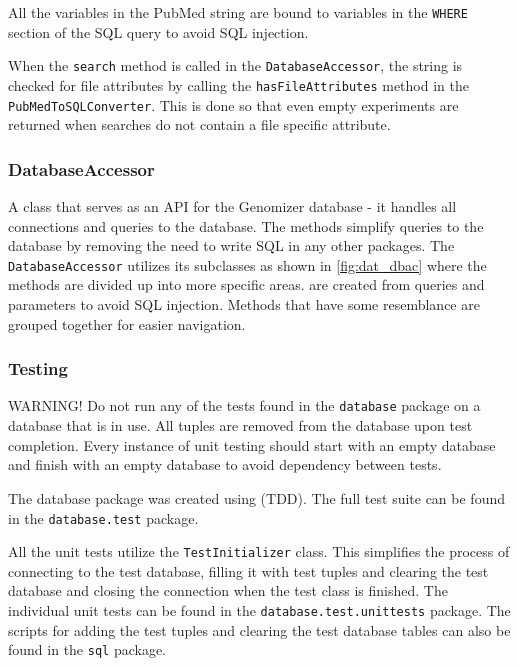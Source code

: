 All the variables in the PubMed string are bound to variables in the \texttt{WHERE} section of the SQL query to avoid SQL injection. 

When the \texttt{search} method is called in the \texttt{DatabaseAccessor}, the  string is checked for file attributes by calling the \texttt{hasFileAttributes} method in the \texttt{PubMedToSQLConverter}. This is done so that even empty experiments are returned when searches do not contain a file specific attribute.

\subsubsection{DatabaseAccessor}
A class that serves as an API for the Genomizer database - it handles all connections and queries to the database. The methods simplify queries to the database by removing the need to write SQL in any other packages. The \texttt{DatabaseAccessor} utilizes its subclasses as shown in \ref{fig:dat_dbac} where the methods are divided up into more specific areas.  are created from queries and parameters to avoid SQL injection. Methods that have some resemblance are grouped together for easier navigation.

\subsubsection{Testing}
WARNING! Do not run any of the tests found in the \texttt{database} package on a database that is in use. All tuples are removed from the database upon test completion. Every instance of unit testing should start with an empty database and finish with an empty database to avoid dependency between tests.

The database package was created using  (TDD). The full test suite can be found in the \texttt{database.test} package.

All the unit tests utilize the \texttt{TestInitializer} class. This simplifies the process of connecting to the test database, filling it with test tuples and clearing the test database and closing the connection when the test class is finished. 
The individual unit tests can be found in the \texttt{database.test.unittests} package. The scripts for adding the test tuples and clearing the test database tables can also be found in the \texttt{sql} package.